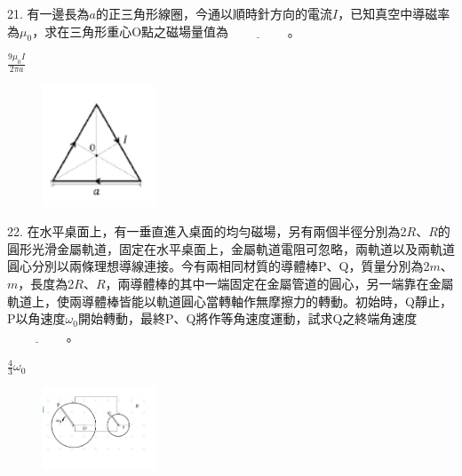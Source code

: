 \documentclass[cn,10pt,math=newtx,chinesefont=founder,device=ig]{elegantbook}
\begin{document}
\newpage


\begin{example}
   21. 有一邊長為$a$的正三角形線圈，今通以順時針方向的電流$I$，已知真空中導磁率為$\mu_0$，求在三角形重心O點之磁場量值為$\underline{\hspace{2cm}}$。\\
    \rightline{[桃園高中教甄109]}
\end{example}
\begin{solution}
    $\frac{9\mu_0 I}{2\pi a}$
\end{solution}
\begin{figure}[htbp]
    \flushright
    \includegraphics[width=0.3\textwidth]{image/109桃園21.png}
  \end{figure}
\newpage


\begin{example}
   22. 在水平桌面上，有一垂直進入桌面的均勻磁場，另有兩個半徑分別為2$R$、$R$的圓形光滑金屬軌道，固定在水平桌面上，金屬軌道電阻可忽略，兩軌道以及兩軌道圓心分別以兩條理想導線連接。今有兩相同材質的導體棒P、Q，質量分別為2$m$、$m$，長度為2$R$、$R$，兩導體棒的其中一端固定在金屬管道的圓心，另一端靠在金屬軌道上，使兩導體棒皆能以軌道圓心當轉軸作無摩擦力的轉動。初始時，Q靜止，P以角速度$\omega_0$開始轉動，最終P、Q將作等角速度運動，試求Q之終端角速度$\underline{\hspace{2cm}}$。\\
    \rightline{[桃園高中教甄109]}
\end{example}
\begin{solution}
    $\frac{4}{3} \omega_0$
\end{solution}
\begin{figure}[htbp]
    \flushright
    \includegraphics[width=0.3\textwidth]{image/109桃園22.png}
  \end{figure}
\newpage
\end{document}
